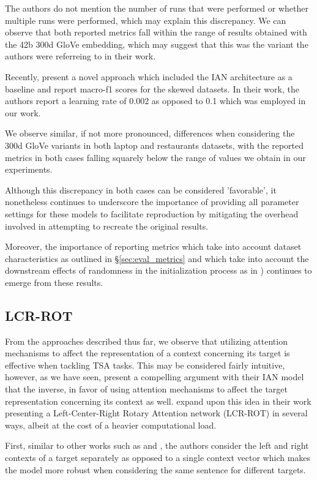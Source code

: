 \documentclass[../../fyp.tex]{subfiles}
\begin{document}
The authors do not mention the number of runs that were performed or whether multiple runs were performed, which may explain this discrepancy. We can observe that both reported metrics fall within the range of results obtained with the 42b 300d GloVe embedding, which may suggest that this was the variant the authors were referreing to in their work. 

Recently, \citet{navonil2020} present a novel approach which included the IAN architecture as a baseline and report macro-f1 scores for the skewed datasets. In their work, the authors report a learning rate of 0.002 as opposed to 0.1 which was employed in our work. 

We observe similar, if not more pronounced, differences when considering the 300d GloVe variants in both laptop and restaurants datasets, with the reported metrics in both cases falling squarely below the range of values we obtain in our experiments. 

Although this discrepancy in both cases can be considered 'favorable', it nonetheless continues to underscore the importance of providing all parameter settings for these models to facilitate reproduction by mitigating the overhead involved in attempting to recreate the original results. 

Moreover, the importance of reporting metrics which take into account dataset characteristics as outlined in \S\ref{sec:eval_metrics} and which take into account the downstream effects of randomness in the initialization process \citet{reimers2017} as in \cite{moore2018}) continues to emerge from these results. 

\subsection{LCR-ROT}
From the approaches described thus far, we observe that utilizing attention mechanisms to affect the representation of a context concerning its target is effective when tackling TSA tasks. This may be considered fairly intuitive, however, as we have seen, \citet{dehongma2017} present a compelling argument with their IAN model that the inverse, in favor of using attention mechanisms to affect the target representation concerning its context as well. \citet{zheng2018} expand upon this idea in their work presenting a Left-Center-Right Rotary Attention network (LCR-ROT) in several ways, albeit at the cost of a heavier computational load. 

First, similar to other works such as \citet{tang2016} and \citet{chen2017}, the authors consider the left and right contexts of a target separately as opposed to a single context vector which makes the model more robust when considering the same sentence for different targets. 
\end{document}
